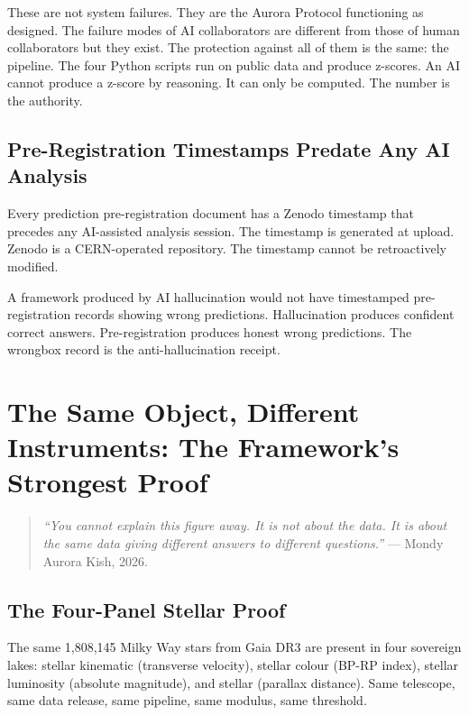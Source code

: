 \documentclass[11pt, letterpaper, openany]{book}
\begin{document}
These are not system failures. They are the Aurora Protocol
functioning as designed. The failure modes of AI collaborators
are different from those of human collaborators but they exist.
The protection against all of them is the same: the pipeline.
The four Python scripts run on public data and produce z-scores.
An AI cannot produce a z-score by reasoning. It can only be
computed. The number is the authority.

\section{Pre-Registration Timestamps Predate Any AI Analysis}

Every prediction pre-registration document has a Zenodo timestamp
that precedes any AI-assisted analysis session. The timestamp is
generated at upload. Zenodo is a CERN-operated repository. The
timestamp cannot be retroactively modified.

A framework produced by AI hallucination would not have timestamped
pre-registration records showing wrong predictions. Hallucination
produces confident correct answers. Pre-registration produces honest
wrong predictions. The wrongbox record is the anti-hallucination receipt.

\clearpage
\chapter{The Same Object, Different Instruments: The Framework's Strongest Proof}

\begin{quote}
\textit{``You cannot explain this figure away.
It is not about the data. It is about the same data
giving different answers to different questions.''} ---
Mondy Aurora Kish, 2026.
\end{quote}

\section{The Four-Panel Stellar Proof}

The same 1,808,145 Milky Way stars from Gaia DR3 are present in
four sovereign lakes: stellar kinematic (transverse velocity),
stellar colour (BP-RP index), stellar luminosity (absolute
magnitude), and stellar (parallax distance). Same telescope,
same data release, same pipeline, same modulus, same threshold.
\end{document}
